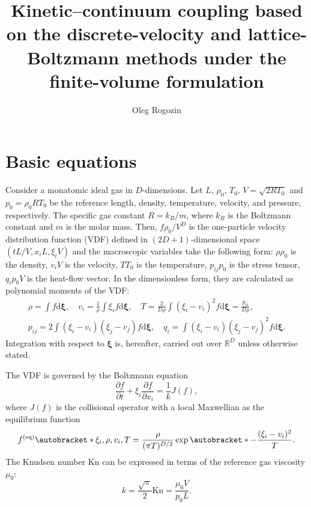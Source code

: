 \documentclass{article}
\title{Kinetic--continuum coupling based on the discrete-velocity and lattice-Boltzmann methods under the finite-volume formulation}
\author{Oleg Rogozin}
\newcommand{\Kn}{\mathrm{Kn}}
\newcommand{\dd}{\mathrm{d}}
\newcommand{\pder}[2][]{\frac{\partial#1}{\partial#2}}
\DeclarePairedDelimiter\autobracket()       %
\newcommand{\br}[1]{\autobracket*{#1}}
\newcommand{\dxi}{\boldsymbol{\dd\xi}}
\newcommand{\bxi}{{\boldsymbol{\xi}}}
\newcommand{\equil}[1]{#1^\mathrm{(eq)}}
\newcommand{\refer}[1]{#1_0}
\begin{document}
\maketitle
\tableofcontents

\section{Basic equations}\label{sec:equations}

Consider a monatomic ideal gas in \(D\)-dimensions.
Let \(L\), \(\refer\rho\), \(\refer{T}\), \(V = \sqrt{2R\refer{T}}\) and \(\refer{p} = \refer{\rho}R\refer{T}\) be
the reference length, density, temperature, velocity, and pressure, respectively.
The specific gas constant \(R = k_B/m\), where \(k_B\) is the Boltzmann constant and \(m\) is the molar mass.
Then, \(f\refer{\rho}/V^D\) is the one-particle velocity distribution function (VDF)
defined in \((2D+1)\)-dimensional space \((tL/V, x_iL, \xi_iV)\) and
the macroscopic variables take the following form:
\(\rho\refer{\rho}\) is the density, \(v_iV\) is the velocity, \(T\refer{T}\) is the temperature,
\(p_{ij}\refer{p}\) is the stress tensor, \(q_i\refer{p}V\) is the heat-flow vector.
In the dimensionless form, they are calculated as polynomial moments of the VDF:
\begin{equation}\label{eq:macro}
    \begin{gathered}
    \rho = \int f \dxi, \quad
    v_i = \frac1{\rho} \int \xi_i f \dxi, \quad
    T = \frac{2}{D\rho}\int(\xi_i-v_i)^2 f \dxi = \frac{p_{ii}}{D\rho}, \\
    p_{ij} = 2 \int(\xi_i-v_i)(\xi_j-v_j) f \dxi, \quad
    q_i = \int(\xi_i-v_i)(\xi_j-v_j)^2 f \dxi.
    \end{gathered}
\end{equation}
Integration with respect to \(\bxi\) is, hereafter, carried out over \(\mathbb{R}^D\) unless otherwise stated.

The VDF is governed by the Boltzmann equation
\begin{equation}\label{eq:Boltzmann}
    \pder[f]{t} + \xi_i\pder[f]{x_i} = \frac1kJ(f),
\end{equation}
where \(J(f)\) is the collisional operator with a local Maxwellian as the equilibrium function
\begin{equation}\label{eq:equilibrium}
    \equil{f}\br{\xi_i,\rho,v_i,T} = \frac{\rho}{(\pi T)^{D/2}}\exp\br{-\frac{(\xi_i - v_i)^2}T}.
\end{equation}
The Knudsen number \(\Kn\) can be expressed in terms of the reference gas viscosity \(\refer\mu\):
\begin{equation}\label{eq:Knudsen_number}
    k = \frac{\sqrt\pi}2\Kn = \frac{\refer\mu V}{\refer{p}L}.
\end{equation}
\end{document}
